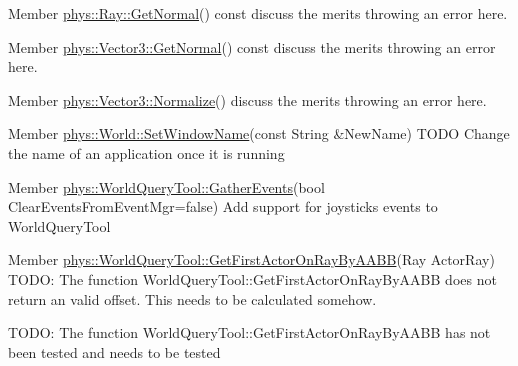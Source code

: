 \label{dd/da0/todo__todo000020}
\hypertarget{dd/da0/todo__todo000020}{}
 
\begin{DoxyDescription}
\item[Member \hyperlink{classphys_1_1Ray_a7445c25acb6ce865ef85e7ada829ccba}{phys::Ray::GetNormal}() const  ]discuss the merits throwing an error here. 
\end{DoxyDescription}

\label{dd/da0/todo__todo000022}
\hypertarget{dd/da0/todo__todo000022}{}
 
\begin{DoxyDescription}
\item[Member \hyperlink{classphys_1_1Vector3_a81e11f45378758391c97ec55b519951c}{phys::Vector3::GetNormal}() const  ]discuss the merits throwing an error here. 
\end{DoxyDescription}

\label{dd/da0/todo__todo000021}
\hypertarget{dd/da0/todo__todo000021}{}
 
\begin{DoxyDescription}
\item[Member \hyperlink{classphys_1_1Vector3_ae39fe0545df88148bcd668b3bd2a4388}{phys::Vector3::Normalize}() ]discuss the merits throwing an error here. 
\end{DoxyDescription}

\label{dd/da0/todo__todo000028}
\hypertarget{dd/da0/todo__todo000028}{}
 
\begin{DoxyDescription}
\item[Member \hyperlink{classphys_1_1World_acd0dff342c08fe3008226488b7c53d97}{phys::World::SetWindowName}(const String \&NewName) ]TODO Change the name of an application once it is running 
\end{DoxyDescription}

\label{dd/da0/todo__todo000029}
\hypertarget{dd/da0/todo__todo000029}{}
 
\begin{DoxyDescription}
\item[Member \hyperlink{classphys_1_1WorldQueryTool_ae387ff047f3cdf408d8959b8cbf4cc57}{phys::WorldQueryTool::GatherEvents}(bool ClearEventsFromEventMgr=false) ]Add support for joysticks events to WorldQueryTool 
\end{DoxyDescription}

\label{dd/da0/todo__todo000030}
\hypertarget{dd/da0/todo__todo000030}{}
 
\begin{DoxyDescription}
\item[Member \hyperlink{classphys_1_1WorldQueryTool_a67575416c2e9c652bbd873649ee38baf}{phys::WorldQueryTool::GetFirstActorOnRayByAABB}(Ray ActorRay) ]TODO: The function WorldQueryTool::GetFirstActorOnRayByAABB does not return an valid offset. This needs to be calculated somehow. 

TODO: The function WorldQueryTool::GetFirstActorOnRayByAABB has not been tested and needs to be tested 
\end{DoxyDescription}


